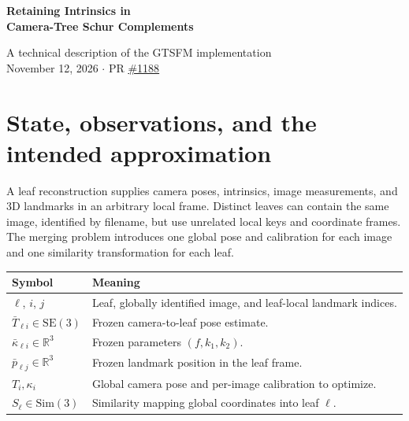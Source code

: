\documentclass[11pt,letterpaper]{article}
\newcommand{\R}{\mathbb{R}}
\newcommand{\SE}{\mathrm{SE}(3)}
\newcommand{\Sim}{\mathrm{Sim}(3)}
\newcommand{\code}[1]{\texttt{\detokenize{#1}}}
\begin{document}
\thispagestyle{empty}
\begin{center}
{\LARGE\bfseries Retaining Intrinsics in\\[4pt] Camera-Tree Schur Complements\par}
\vspace{9pt}
{\large A technical description of the GTSFM implementation}\\[5pt]
{\small November 12, 2026 \quad $\cdot$ \quad PR \href{https://github.com/borglab/gtsfm/pull/1188}{\#1188}}
\end{center}
\vspace{3pt}
\begin{abstract}
\noindent Independently reconstructed image clusters can be merged by combining
frozen, landmark-free camera likelihoods. To refine calibration during merging,
the reduced state must contain both poses and intrinsics: only landmark increments
are eliminated. This note derives the retained quadratic, its gauge treatment,
and its conversion into similarity-aware factors for a single global solve.
It also specifies the public data contract, fixed-intrinsics compatibility mode,
and the limits of the resulting approximation.
\end{abstract}

\section{State, observations, and the intended approximation}
A leaf reconstruction supplies camera poses, intrinsics, image measurements, and
3D landmarks in an arbitrary local frame. Distinct leaves can contain the same
image, identified by filename, but use unrelated local keys and coordinate frames.
The merging problem introduces one global pose and calibration for each image
and one similarity transformation for each leaf.

\begin{center}
\begin{tabularx}{\linewidth}{@{}lX@{}}
\toprule
Symbol & Meaning \\
\midrule
$\ell$, $i$, $j$ & Leaf, globally identified image, and leaf-local landmark indices. \\
$\bar T_{\ell i}\in\SE$ & Frozen camera-to-leaf pose estimate. \\
$\bar\kappa_{\ell i}\in\R^3$ & Frozen \code{Cal3Bundler} parameters $(f,k_1,k_2)$. \\
$\bar p_{\ell j}\in\R^3$ & Frozen landmark position in the leaf frame. \\
$T_i,\kappa_i$ & Global camera pose and per-image calibration to optimize. \\
$S_\ell\in\Sim$ & Similarity mapping global coordinates into leaf $\ell$. \\
\bottomrule
\end{tabularx}
\end{center}
\end{document}
